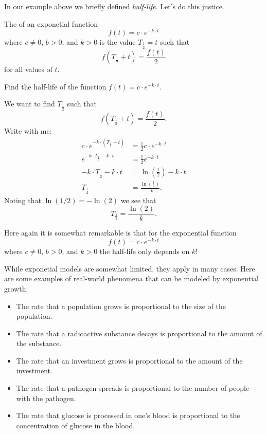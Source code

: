 \documentclass{ximera}
\begin{document}
In our example above we briefly defined \textit{half-life}. Let's do
this justice.

\begin{definition}
  The  of an exponetial function
  \[
  f(t) = c\cdot e^{-k\cdot t}
  \]
  where $c\ne 0$, $b>0$, and $k>0$ is the value $T_{\frac{1}{2}} =t$ such that
  \[
  f(T_{\frac{1}{2}}+t) =  \frac{f(t)}{2}
  \]
  for all values of $t$.
\end{definition}

\begin{example}
  Find the half-life of the function $f(t) = c\cdot e^{-k\cdot t}$.
  \begin{explanation}
    We want to find $T_{\frac{1}{2}}$ such that
    \[
    f(T_{\frac{1}{2}}+t) = \frac{f(t)}{2}.
    \]
    Write with me:
    \begin{align*}
    c\cdot e^{-k\cdot (T_{\frac{1}{2}}+t)} &= \frac{1}{2} c\cdot e^{-k\cdot t}\\
    e^{-k\cdot T_{\frac{1}{2}}-k\cdot t} &= \frac{1}{2} e^{-k\cdot t}\\
    -k\cdot T_{\frac{1}{2}}-k\cdot t &= \ln \left(\frac{1}{2}\right) - k\cdot t\\
    T_{\frac{1}{2}} &= \frac{\ln \left(\frac{1}{2}\right)}{-k}.
    \end{align*}
    Noting that $\ln(1/2) = -\ln(2)$ we see that
    \[
    T_{\frac{1}{2}} = \frac{\ln(2)}{k}.
    \]
  \end{explanation}
\end{example}

Here again it is somewhat remarkable is that for the exponential
function
  \[
  f(t) = c\cdot e^{-k\cdot t}
  \]
  where $c\ne 0$, $b>0$, and $k>0$ the half-life only depends on $k$!


  While exponetial models are somewhat limited, they apply in many
  cases. Here are some examples of real-world phenomena that can be
  modeled by exponential growth:
\begin{itemize}
  \item The rate that a population grows is proportional to the size
    of the population.
  \item The rate that a radioactive substance decays is proportional
    to the amount of the substance.
  \item The rate that an investment grows is proportional to the
    amount of the investment.
  \item The rate that a pathogen spreads is proportional to the number
    of people with the pathogen.
  \item The rate that glucose is processed in one's blood is
    proportional to the concentration of glucose in the blood.
\end{itemize}


  
  
\end{document}
